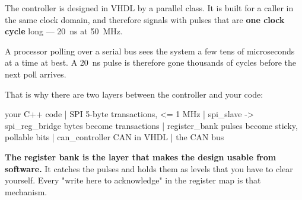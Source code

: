 The controller is designed in VHDL by a parallel class. It is built for a caller in the same clock
domain, and therefore signals with pulses that are \textbf{one clock cycle} long --- 20~ns at
50~MHz.

A processor polling over a serial bus sees the system a few tens of microseconds at a time at
best. A 20~ns pulse is therefore gone thousands of cycles before the next poll arrives.

That is why there are two layers between the controller and your code:

\begin{console}
                your C++ code
                      |
                     SPI                  5-byte transactions, <= 1 MHz
                      |
   spi_slave  ->  spi_reg_bridge          bytes become transactions
                      |
              register_bank               pulses become sticky, pollable bits
                      |
              can_controller              CAN in VHDL
                      |
                  the CAN bus
\end{console}

\textbf{The register bank is the layer that makes the design usable from software.} It catches
the pulses and holds them as levels that you have to clear yourself. Every "write  here
to acknowledge" in the register map is that mechanism.
